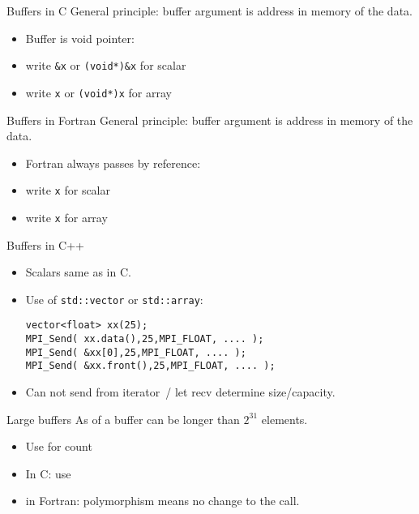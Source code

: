 \begin{numberedframe}{Buffers in C}
  General principle: buffer argument is address in memory of the data.
  \begin{itemize}
  \item Buffer is void pointer: 
  \item write \lstinline{&x} or \lstinline{(void*)&x} for scalar
  \item write \lstinline{x} or \lstinline{(void*)x} for array
  \end{itemize}
\end{numberedframe}

\begin{numberedframe}{Buffers in Fortran}
  General principle: buffer argument is address in memory of the data.
  \begin{itemize}
  \item Fortran always passes by reference:
  \item write \lstinline{x} for scalar
  \item write \lstinline{x} for array
  \end{itemize}
\end{numberedframe}

\begin{numberedframe}{Buffers in C++}
 \lstset{language=C++}
  \begin{itemize}
  \item Scalars same as in C.
  \item Use of \lstinline+std::vector+ or \lstinline+std::array+:
\begin{lstlisting}
vector<float> xx(25);
MPI_Send( xx.data(),25,MPI_FLOAT, .... );
MPI_Send( &xx[0],25,MPI_FLOAT, .... );
MPI_Send( &xx.front(),25,MPI_FLOAT, .... );
\end{lstlisting}
\item Can not send from iterator~/
  let recv determine size/capacity.
  \end{itemize}
 \lstset{language=C}
\end{numberedframe}

\begin{numberedframe}{Large buffers}
  As of  a buffer can be longer than $2^{31}$ elements.\\
  \begin{itemize}
  \item Use  for count
  \item In C: use 
  \item in Fortran: polymorphism means no change to the call.
  \end{itemize}
\end{numberedframe}

